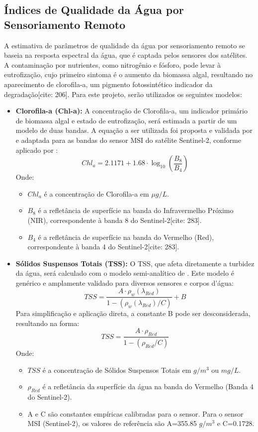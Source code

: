 \documentclass[12pt, a4paper]{article}
\begin{document}
\subsection{Índices de Qualidade da Água por Sensoriamento Remoto}
A estimativa de parâmetros de qualidade da água por sensoriamento remoto se baseia na resposta espectral da água, que é captada pelos sensores dos satélites. A contaminação por nutrientes, como nitrogênio e fósforo, pode levar à eutrofização, cujo primeiro sintoma é o aumento da biomassa algal, resultando no aparecimento de clorofila-a, um pigmento fotossintético indicador da degradação[cite: 206]. Para este projeto, serão utilizados os seguintes modelos:

\begin{itemize}
    \item \textbf{Clorofila-a (Chl-a):} A concentração de Clorofila-a, um indicador primário de biomassa algal e estado de eutrofização, será estimada a partir de um modelo de duas bandas. A equação a ser utilizada foi proposta e validada por \cite{londe2013} e adaptada para as bandas do sensor MSI do satélite Sentinel-2, conforme aplicado por \cite{moraes2023}:
    \begin{equation}
      Chl_a = 2.1171 + 1.68 \cdot \log_{10}\left(\frac{B_{8}}{B_{4}}\right)
    \end{equation}
    Onde:
    \begin{itemize}
        \item $Chl_a$ é a concentração de Clorofila-a em $\mu g/L$.
        \item $B_{8}$ é a refletância de superfície na banda do Infravermelho Próximo (NIR), correspondente à banda 8 do Sentinel-2[cite: 283].
        \item $B_{4}$ é a refletância de superfície na banda do Vermelho (Red), correspondente à banda 4 do Sentinel-2[cite: 283].
    \end{itemize}

    \item \textbf{Sólidos Suspensos Totais (TSS):} O TSS, que afeta diretamente a turbidez da água, será calculado com o modelo semi-analítico de \cite{nechad2010}. Este modelo é genérico e amplamente validado para diversos sensores e corpos d'água:
    \begin{equation}
     TSS = \frac{A \cdot \rho_{w}(\lambda_{Red})}{1 - (\rho_{w}(\lambda_{Red}) / C)} + B
    \end{equation}
    Para simplificação e aplicação direta, a constante B pode ser desconsiderada, resultando na forma:
    $$ TSS = \frac{A \cdot \rho_{Red}}{1 - (\rho_{Red} / C)} $$
    Onde:
    \begin{itemize}
        \item $TSS$ é a concentração de Sólidos Suspensos Totais em $g/m^3$ ou $mg/L$.
        \item $\rho_{Red}$ é a refletância da superfície da água na banda do Vermelho (Banda 4 do Sentinel-2).
        \item A e C são constantes empíricas calibradas para o sensor. Para o sensor MSI (Sentinel-2), os valores de referência são A=355.85 $g/m^3$ e C=0.1728.
    \end{itemize}
\end{itemize}
\end{document}

